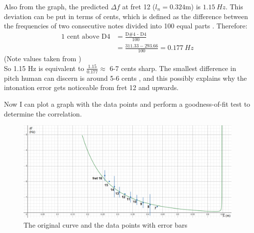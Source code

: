 Also from the graph, the predicted $\Delta f$ at fret 12 ($l_n = 0.324$m) is $\SI{1.15}{Hz}$. This deviation can be put in terms of cents, which is defined as the difference between the frequencies of two consecutive notes divided into 100 equal parts \cite{cents}. Therefore:
\begin{align*}
    \text{1 cent above D4} &= \frac{\text{D\#4 - D4}}{100} \\  
    &= \frac{311.33-293.66}{100} = \SI{0.177}{Hz} 
\end{align*}
(Note values taken from \cite{freq_chart}) \\
So 1.15 Hz is equivalent to $\frac{1.15}{0.177} \approx $ 6-7 cents sharp. The smallest difference in pitch human can discern is around 5-6 cents \cite{loeffler}, and this possibly explains why the intonation error gets noticeable from fret 12 and upwards. \par
Now I can plot a graph with the data points and perform a goodness-of-fit test to determine the correlation.
\begin{figure}[!h]
    \includegraphics[width = \textwidth]{./ee/graph_with_data.png}
    \caption{The original curve and the data points with error bars} \label{fig9}
\end{figure}